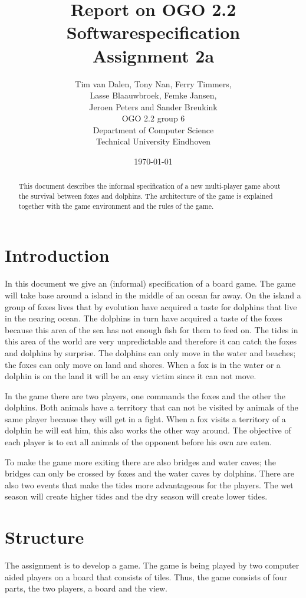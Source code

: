\documentclass[12pt]{article}
\title{Report on OGO 2.2 Softwarespecification\\ Assignment 2a}
\author{
        Tim van Dalen, Tony Nan, Ferry Timmers, \\ Lasse Blaauwbroek, Femke Jansen, \\Jeroen Peters and Sander Breukink\\ OGO 2.2 group 6 \\
                Department of Computer Science\\
        Technical University Eindhoven\\
}
\date{\today}
\begin{document}
\maketitle

\begin{abstract}
This document describes the informal specification of a new multi-player game about the survival between foxes and dolphins. The architecture of the game is explained together with the game environment and the rules of the game.
\end{abstract}

\section{Introduction}

In this document we give an (informal) specification of a board game.
The game will take base around a island in the middle of an ocean far away. On the island a group of foxes
lives that by evolution have acquired a taste for dolphins that live
in the nearing ocean. The dolphins in turn have acquired a taste of
the foxes because this area of the sea has not enough fish for them
to feed on. The tides in this area of the world are very unpredictable
and therefore it can catch the foxes and dolphins by surprise. The
dolphins can only move in the water and beaches; the foxes can only
move on land and shores. When a fox is in the water or a dolphin is
on the land it will be an easy victim since it can not move.

In the game there are two players, one commands the foxes and the
other the dolphins. Both animals have a territory that can not be
visited by animals of the same player because they will get in a fight.
When a fox visits a territory of a dolphin he will eat him, this also
works the other way around. The objective of each player is to eat
all animals of the opponent before his own are eaten.

To make the game more exiting there are also bridges and water caves;
the bridges can only be crossed by foxes and the water caves by dolphins.
There are also two events that make the tides more advantageous for
the players. The wet season will create higher tides and the dry season
will create lower tides.

\section{Structure}

The assignment is to develop a game. The game is being played by two computer aided players on a board that consists of tiles.
Thus, the game consists of four parts, the two players, a board and the view.
\end{document}
